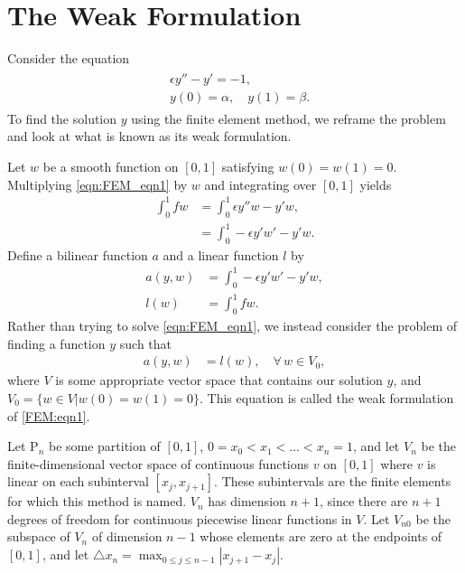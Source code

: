 \section*{The Weak Formulation}
Consider the equation
\begin{align}
	\begin{split}
	&{ }\epsilon y'' - y' = -1,\\
	&{ }y(0) = \alpha, \quad y(1) = \beta .
	\end{split}\label{eqn:FEM_eqn1}
\end{align}
To find the solution $y$ using the finite element method, we reframe the problem and look at what is known as its weak formulation.

Let $w$ be a smooth function on $[0,1]$ satisfying $w(0) = w(1) = 0$.
Multiplying \eqref{eqn:FEM_eqn1} by $w$ and integrating over $[0,1]$ yields
\begin{align*}
	\int_0^1 f w &= \int_0^1 \epsilon y''w - y'w, \\
	&= \int_0^1 -\epsilon y'w' - y'w.
\end{align*}
Define a bilinear function $a$ and a linear function $l$ by
\begin{align*}
a(y,w) &= \int_0^1 -\epsilon y'w' - y'w,\\
l(w) &= \int_0^1 f w.
\end{align*}
Rather than trying to solve \eqref{eqn:FEM_eqn1}, we instead consider the problem of finding a function $y$ such that
\begin{align}
	a(y,w) &= l(w), \quad \forall \, w \in V_0,
	\label{eqn:FEM_integral_form}
\end{align}
where $V$ is some appropriate vector space that contains our solution $y$, and $V_0 = \{w \in V|w(0) = w(1) = 0\}$.
This equation is called the weak formulation of \eqref{FEM:eqn1}.

Let $\mathrm{P}_n$ be some partition of $[0,1]$, $0 = x_0 < x_1< \ldots < x_{n} = 1$, and let $V_n$ be the finite-dimensional vector space of continuous functions $v$ on $[0,1]$ where $v$ is linear on each subinterval $[{x_j,x_{j+1}}]$.
These subintervals are the finite elements for which this method is named.
$V_n$ has dimension $n+1$, since there are $n+1$ degrees of freedom for continuous piecewise linear functions in $V$.
Let $V_{n0}$ be the subspace of $V_n$ of dimension $n-1$ whose elements are zero at the endpoints of $[0,1]$, and let $\triangle x_n = \max_{0 \leq j \leq n-1}|x_{j+1} - x_j|$.


